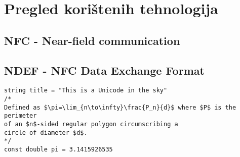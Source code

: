 \chapter{Pregled korištenih tehnologija}
\section{NFC - Near-field communication}
\section{NDEF - NFC Data Exchange Format}

\begin{verbatim}
string title = "This is a Unicode in the sky"
/*
Defined as $\pi=\lim_{n\to\infty}\frac{P_n}{d}$ where $P$ is the perimeter
of an $n$-sided regular polygon circumscribing a
circle of diameter $d$.
*/
const double pi = 3.1415926535
\end{verbatim}
